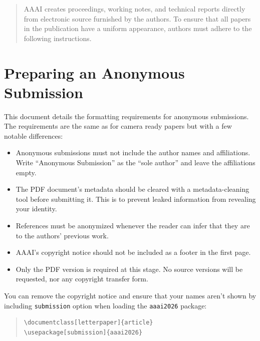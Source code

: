 \makeatletter
{}
\newcommand{\tightlist}
\makeatother

\maketitle
\begin{abstract}
AAAI creates proceedings, working notes, and technical reports directly
from electronic source furnished by the authors. To ensure that all
papers in the publication have a uniform appearance, authors must adhere
to the following instructions.
\end{abstract}
\section{Preparing an Anonymous
Submission}\label{preparing-an-anonymous-submission}

This document details the formatting requirements for anonymous
submissions. The requirements are the same as for camera ready papers
but with a few notable differences:

\begin{itemize}
\tightlist
\item
  Anonymous submissions must not include the author names and
  affiliations. Write ``Anonymous Submission'' as the ``sole author''
  and leave the affiliations empty.
\item
  The PDF document's metadata should be cleared with a metadata-cleaning
  tool before submitting it. This is to prevent leaked information from
  revealing your identity.
\item
  References must be anonymized whenever the reader can infer that they
  are to the authors' previous work.
\item
  AAAI's copyright notice should not be included as a footer in the
  first page.
\item
  Only the PDF version is required at this stage. No source versions
  will be requested, nor any copyright transfer form.
\end{itemize}

You can remove the copyright notice and ensure that your names aren't
shown by including \texttt{submission} option when loading the
\texttt{aaai2026} package:

\begin{quote}\begin{scriptsize}\begin{verbatim}
\documentclass[letterpaper]{article}
\usepackage[submission]{aaai2026}
\end{verbatim}\end{scriptsize}\end{quote}

